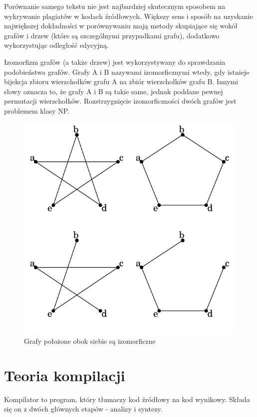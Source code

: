 \documentclass[a4paper,12pt]{article}
\begin{document}
Porównanie samego tekstu nie jest najbardziej skutecznym sposobem na wykrywanie plagiatów w kodach źródłowych. Większy sens i sposób na uzyskanie największej dokładności w porównywaniu mają metody skupiające się wokół grafów i drzew (które są szczególnymi przypadkami grafu), dodatkowo wykorzystując odległość edycyjną.

Izomorfizm grafów (a także drzew) jest wykorzystywany do sprawdzania podobieństwa grafów. Grafy A i B nazywami izomorficznymi wtedy, gdy istnieje bijekcja zbioru wierzchołków grafu A na zbiór wierzchołków grafu B. Innymi słowy oznacza to, że grafy A i B są takie same, jednak poddane pewnej permutacji wierzchołków. Rozstrzygnięcie izomorficzności dwóch grafów jest problemem klasy NP.

\begin{figure}[h!]
\centering
\includegraphics[scale=0.45]{gfx/isomorphism.png}
\caption{Grafy położone obok siebie są izomorficzne}
\end{figure}

\newpage

\section{Teoria kompilacji}

Kompilator to program, który tłumaczy kod źródłowy na kod wynikowy. Składa się on z dwóch głównych etapów - analizy i syntezy.
\end{document}
